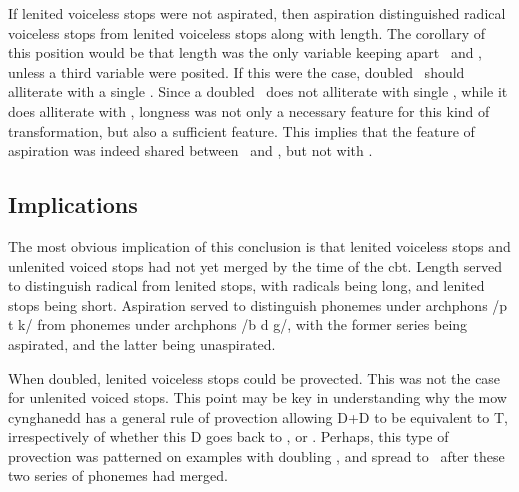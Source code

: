 If lenited voiceless stops were not aspirated, then aspiration distinguished radical voiceless stops from lenited voiceless stops along with length. The corollary of this position would be that length was the only variable keeping apart \lT\ and \xD, unless a third variable were posited. If this were the case, doubled \lT\ should alliterate with a single \xD. Since a doubled \lT\ does not alliterate with single \xD, while it does alliterate with \xT, longness was not only a necessary feature for this kind of transformation, but also a  sufficient feature. This implies that the feature of aspiration was indeed shared between \lT\ and \xT, but not with \xD.

\subsection{Implications}
The most obvious implication of this conclusion is that lenited voiceless stops and unlenited voiced stops had not yet merged by the time of the \gls{cbt}. Length served to distinguish radical from lenited stops, with radicals being long, and lenited stops being short. Aspiration served to distinguish phonemes under \gls{archphon}s /p t k/ from phonemes under \gls{archphon}s /b d g/, with the former series being aspirated, and the latter being unaspirated.

When doubled, lenited voiceless stops could be provected. This was not the case for unlenited voiced stops. This point may be key in understanding why the \gls{mow} cynghanedd has a general rule of provection allowing \gls{D}+\gls{D} to be equivalent to \gls{T}, irrespectively of whether this \gls{D} goes back to \lT, or \xD. Perhaps, this type of provection was patterned on examples with doubling \lT, and spread to \xD\ after these two series of phonemes had merged.


